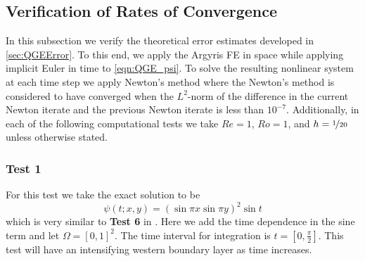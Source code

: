 \subsection{Verification of Rates of Convergence}
In this subsection we verify the theoretical error estimates developed in
\autoref{sec:QGEError}. To this end, we apply the Argyris FE in space while
applying implicit Euler in time to \eqref{eqn:QGE_psi}. To solve the resulting
nonlinear system at each time step we apply Newton's method where the Newton's
method is considered to have converged when the $L^2$-norm of the difference in
the current Newton iterate and the previous Newton iterate is less than
$10^{-7}$. Additionally, in each of the following computational tests we take
$Re = 1$, $Ro = 1$, and $h = \nicefrac{1}{20}$ unless otherwise stated.

\subsubsection*{Test 1}
For this test we take the exact solution to be
\begin{equation}
  \psi(t;x,y) = \left(\sin \pi x \sin \pi y\right)^2 \sin t
  \label{eqn:Test1}
\end{equation}
which is very similar to \textbf{Test 6} in \cite{Foster}. Here we add the time
dependence in the sine term and let $\Omega = [0,1]^2$. The time interval for
integration is $t = [0,\frac{\pi}{2}]$. This test will have an intensifying
western boundary layer as time increases.

